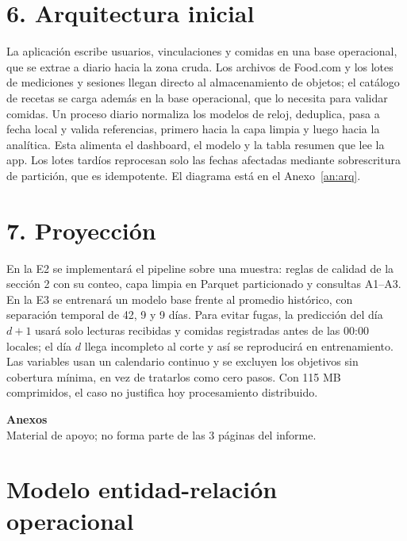 \documentclass[11pt]{article}
\newcommand{\seccion}[1]{\vspace{-1.2ex}\section*{#1}\vspace{-0.6ex}}
\begin{document}
\seccion{6. Arquitectura inicial}

La aplicación escribe usuarios, vinculaciones y comidas en una base
operacional, que se extrae a diario hacia la zona cruda. Los archivos
de Food.com y los lotes de mediciones y sesiones llegan directo al
almacenamiento de objetos; el catálogo de recetas se carga además en
la base operacional, que lo necesita para validar comidas. Un proceso
diario normaliza los modelos de reloj, deduplica, pasa a fecha local y
valida referencias, primero hacia la capa limpia y luego hacia la
analítica. Esta alimenta el dashboard, el modelo y la tabla resumen
que lee la app. Los lotes tardíos reprocesan solo las fechas afectadas
mediante sobrescritura de partición, que es idempotente. El diagrama
está en el Anexo~\ref{an:arq}.

\seccion{7. Proyección}

En la E2 se implementará el pipeline sobre una muestra: reglas de
calidad de la sección 2 con su conteo, capa limpia en Parquet
particionado y consultas A1--A3. En la E3 se entrenará un modelo base
frente al promedio histórico, con separación temporal de 42, 9 y 9
días. Para evitar fugas, la predicción del día $d+1$ usará solo
lecturas recibidas y comidas registradas antes de las 00:00 locales;
el día $d$ llega incompleto al corte y así se reproducirá en
entrenamiento. Las variables usan un calendario continuo y se excluyen
los objetivos sin cobertura mínima, en vez de tratarlos como cero
pasos. Con 115 MB comprimidos, el caso no justifica hoy procesamiento
distribuido.


\clearpage
\appendix

\begin{center}
{\Large\textbf{Anexos}}\\[3pt]
{\small Material de apoyo; no forma parte de las 3 páginas del informe.}
\end{center}
\vspace{-0.4cm}

\section{Modelo entidad-relación operacional}\label{an:er}
\end{document}
